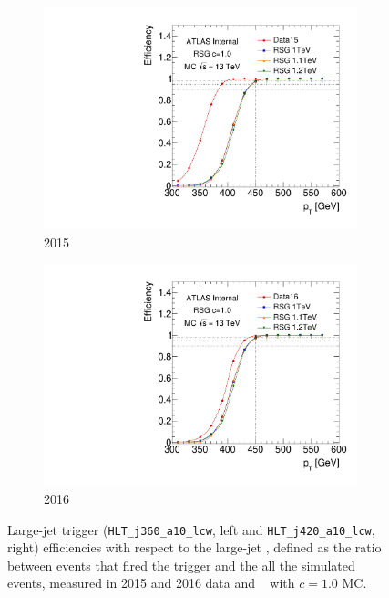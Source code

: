 \begin{figure}[htbp!]
    \captionsetup{justification=centering}
    \begin{subfigure}[b]{0.45\textwidth}
        \includegraphics[width=\textwidth,angle=-90]{figures/boosted/Trigger/trig_15_b77_pT_Efficiency.pdf}
        \caption{2015}
        \label{fig:boosted-trigger-HLT-turnon-2015}
    \end{subfigure}
    \quad
    \begin{subfigure}[b]{0.45\textwidth}
        \includegraphics[width=\textwidth,angle=-90]{figures/boosted/Trigger/trig_16_b77_pT_Efficiency.pdf}
        \caption{2016}
        \label{fig:boosted-trigger-HLT-turnon-2016}
    \end{subfigure}
  \caption{Large-\R jet trigger (\texttt{HLT\_j360\_a10\_lcw}, left and \texttt{HLT\_j420\_a10\_lcw}, right) efficiencies with respect to the large-\R jet \pt, defined as the ratio between events that fired the trigger and the all the simulated events, measured in 2015 and 2016 data and \Grav~ with $c=1.0$ MC.}
  \label{fig:boosted-trigger-HLT-turnon}
\end{figure}


